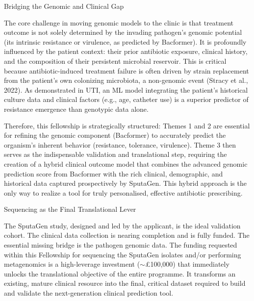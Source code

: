 Bridging the Genomic and Clinical Gap

The core challenge in moving genomic models to the clinic is that treatment outcome is not solely determined by the invading pathogen's genomic potential (its intrinsic resistance or virulence, as predicted by Bacformer). It is profoundly influenced by the patient context: their prior antibiotic exposure, clinical history, and the composition of their persistent microbial reservoir. This is critical because antibiotic-induced treatment failure is often driven by strain replacement from the patient’s own colonizing microbiota, a non-genomic event (Stracy et al., 2022). As demonstrated in UTI, an ML model integrating the patient's historical culture data and clinical factors (e.g., age, catheter use) is a superior predictor of resistance emergence than genotypic data alone.

Therefore, this fellowship is strategically structured: Themes 1 and 2 are essential for refining the genomic component (Bacformer) to accurately predict the organism's inherent behavior (resistance, tolerance, virulence). Theme 3 then serves as the indispensable validation and translational step, requiring the creation of a hybrid clinical outcome model that combines the advanced genomic prediction score from Bacformer with the rich clinical, demographic, and historical data captured prospectively by SputaGen. This hybrid approach is the only way to realize a tool for truly personalised, effective antibiotic prescribing.

Sequencing as the Final Translational Lever

The SputaGen study, designed and led by the applicant, is the ideal validation cohort. The clinical data collection is nearing completion and is fully funded. The essential missing bridge is the pathogen genomic data. The funding requested within this Fellowship for sequencing the SputaGen isolates and/or performing metagenomics is a high-leverage investment ($\sim$£100,000) that immediately unlocks the translational objective of the entire programme. It transforms an existing, mature clinical resource into the final, critical dataset required to build and validate the next-generation clinical prediction tool.

